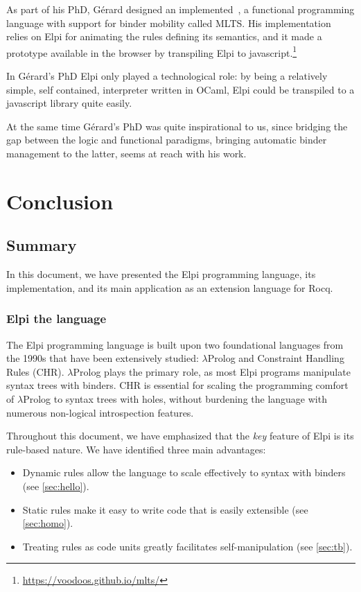 \documentclass[a4paper, 11pt]{book}
\begin{document}
As part of his PhD, G\'{e}rard designed an implemented~\cite{mlts}, a
functional programming language with support for binder mobility
called MLTS.
His implementation relies on Elpi for animating the rules defining
its semantics, and it made a prototype available in the browser by
transpiling Elpi to javascript.\footnote{\url{https://voodoos.github.io/mlts/}}

In  G\'{e}rard's PhD Elpi only played a technological role: by being
a relatively simple, self contained, interpreter written in OCaml,
Elpi could be transpiled to a javascript library quite easily.

At the same time G\'{e}rard's PhD was quite inspirational to us, since
bridging the gap between the logic and functional paradigms, bringing
automatic binder management to the latter, seems at reach with his work.

\chapter{Conclusion}

\section{Summary}


In this document, we have presented the Elpi programming language, its
implementation, and its main application as an extension language for Rocq.

\subsection{Elpi the language}

The Elpi programming language is built upon two foundational languages from the
1990s that have been extensively studied: $\lambda$Prolog and Constraint
Handling Rules (CHR). $\lambda$Prolog plays the primary role, as most Elpi
programs manipulate syntax trees with binders. CHR is essential for scaling the
programming comfort of $\lambda$Prolog to syntax trees with holes, without
burdening the language with numerous non-logical introspection features.

Throughout this document, we have emphasized that the \emph{key} feature of Elpi
is its rule-based nature. We have identified three main advantages:
\begin{itemize}
\item Dynamic rules allow the language to scale effectively to syntax with binders (see \cref{sec:hello}).
\item Static rules make it easy to write code that is easily extensible (see \cref{sec:homo}).
\item Treating rules as code units greatly facilitates self-manipulation (see \cref{sec:tb}).
\end{itemize}
\end{document}
